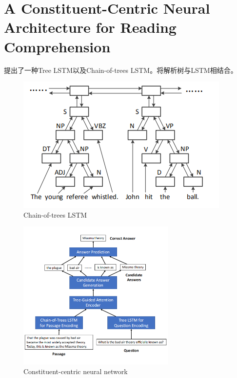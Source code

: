 \documentclass[a4paper,UTF8]{article}
\numberwithin{equation}{section}
\begin{document}
\section{A Constituent-Centric Neural Architecture for Reading Comprehension}
提出了一种Tree LSTM以及Chain-of-trees LSTM。将解析树与LSTM相结合。
\begin{figure}[H]
	\centering
	\includegraphics[]{8-1.png}
	\caption{Chain-of-trees LSTM}
\end{figure}
\begin{figure}[H]
	\centering
	\includegraphics[width=0.7\textwidth]{8-2.png}
	\caption{Constituent-centric neural network}
\end{figure} 


\newpage
\end{document}
